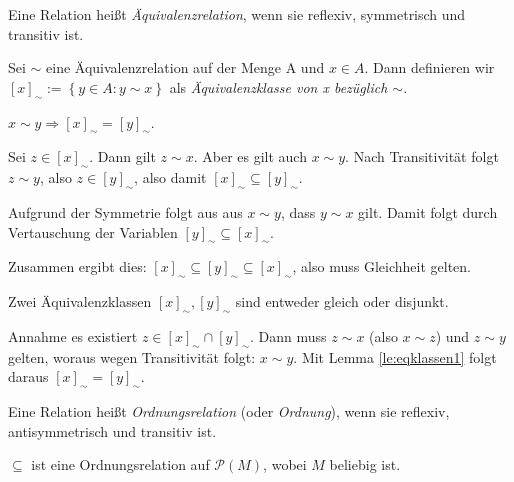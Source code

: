 \documentclass[10pt]{scrbook}
\begin{document}
\begin{Def}
Eine Relation heißt \emph{Äquivalenzrelation}, wenn sie reflexiv, symmetrisch und transitiv ist.
\end{Def}


\begin{Def}
Sei $\sim$ eine Äquivalenzrelation auf der Menge A und $x\in A$. Dann definieren wir $\left[x\right]_\sim := \left\{y \in A: y \sim x\right\}$ als \emph{Äquivalenzklasse von x bezüglich $\sim$}.
\end{Def}

\begin{Le}
$x\sim y \Rightarrow \left[x\right]_\sim = \left[y\right]_\sim$.
\label{le:eqklassen1}
\end{Le}

\begin{bew}

Sei $z\in \left[x\right]_\sim$. Dann gilt $z\sim x$. Aber es gilt auch $x\sim y$. Nach Transitivität folgt $z\sim y$, also $z\in \left[y\right]_\sim$, also damit  $\left[x\right]_\sim \subseteq \left[y\right]_\sim$.

Aufgrund der Symmetrie folgt aus aus $x\sim y$, dass $y\sim x$ gilt. Damit folgt durch Vertauschung der Variablen  $\left[y\right]_\sim \subseteq \left[x\right]_\sim$.

Zusammen ergibt dies: $\left[x\right]_\sim \subseteq \left[y\right]_\sim \subseteq \left[x\right]_\sim$, also muss Gleichheit gelten.
\end{bew}

\begin{Le}
Zwei Äquivalenzklassen $\left[x\right]_\sim, \left[y\right]_\sim$ sind entweder gleich oder disjunkt.
\end{Le}

\begin{bew}
Annahme es existiert $z\in \left[x\right]_\sim \cap \left[y\right]_\sim$. Dann muss $z\sim x$ (also $x\sim z$) und $z\sim y$ gelten, woraus wegen Transitivität folgt: $x\sim y$. Mit Lemma \ref{le:eqklassen1} folgt daraus $\left[x\right]_\sim = \left[y\right]_\sim$.
\end{bew}

\begin{Def}
Eine Relation heißt \emph{Ordnungsrelation} (oder \emph{Ordnung}), wenn sie reflexiv, antisymmetrisch und transitiv ist.
\end{Def}

\begin{Bsp}
$\subseteq$ ist eine Ordnungsrelation auf $\mathcal{P}(M)$, wobei $M$ beliebig ist.
\end{Bsp}
\end{document}

